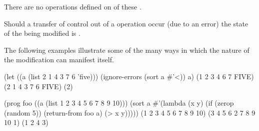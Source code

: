 
There are no   operations
defined on  of these .

\endlist

\endsubsection%



Should a transfer of control out of a  operation occur
(\eg due to an error) the state of the  being modified is
.


The following examples illustrate some of the many ways in which the
 nature of the modification can manifest
itself.

\code
 (let ((a (list 2 1 4 3 7 6 'five)))
   (ignore-errors (sort a #'<))
   a)
\EV (1 2 3 4 6 7 FIVE)
\OV (2 1 4 3 7 6 FIVE)
\OV (2)

 (prog foo ((a (list 1 2 3 4 5 6 7 8 9 10)))
   (sort a #'(lambda (x y) (if (zerop (random 5)) (return-from foo a) (> x y)))))
\EV (1 2 3 4 5 6 7 8 9 10)
\OV (3 4 5 6 2 7 8 9 10 1)
\OV (1 2 4 3)
\endcode

\endsubsubsection%

\endsubsection%

